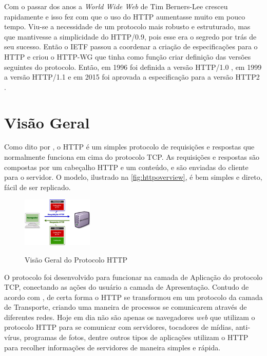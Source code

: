 Com o passar dos anos a \textit{World Wide Web} de Tim Berners-Lee cresceu rapidamente e isso fez com que o uso do HTTP aumentasse muito em pouco tempo. Viu-se a necessidade de um protocolo mais robusto e estruturado, mas que mantivesse a simplicidade do HTTP/0.9, pois esse era o segredo por trás de seu sucesso. Então o IETF  passou a coordenar a criação de especificações para o HTTP e criou o HTTP-WG que tinha como função criar definição das versões seguintes do protocolo. Então, em 1996 foi definida a versão HTTP/1.0 \cite{RFC1945}, em 1999 a versão HTTP/1.1 \cite{RFC2616} e em 2015 foi aprovada a especificação para a versão HTTP2 \cite{HTTP2Spec}.

\section{Visão Geral}
\label{sec:http_visão_geral}

Como dito por \cite{Tanenbaum}, o HTTP é um simples protocolo de requisições e respostas que normalmente funciona em cima do protocolo TCP. As requisições e respostas são compostas por um cabeçalho HTTP e um conteúdo, e são enviadas do cliente para o servidor. O modelo, ilustrado na \autoref{fig:httpoverview}, é bem simples e direto, fácil de ser replicado.

\begin{figure}[!htb]
    \centering
    \caption{Visão Geral do Protocolo HTTP}
    \includegraphics[width=0.3\textwidth]{./04-figuras/fund-teorica/http_overview}
    \label{fig:httpoverview}
\end{figure}

O protocolo foi desenvolvido para funcionar na camada de Aplicação do protocolo TCP, conectando as ações do usuário a camada de Apresentação. Contudo de acordo com \cite{Tanenbaum}, de certa forma o HTTP se transformou em um protocolo da camada de Transporte, criando uma maneira de processos se comunicarem através de diferentes redes. Hoje em dia não são apenas os navegadores \textit{web} que utilizam o protocolo HTTP para se comunicar com servidores, tocadores de mídias, anti-vírus, programas de fotos, dentre outros tipos de aplicações utilizam o HTTP para recolher informações de servidores de maneira simples e rápida.

